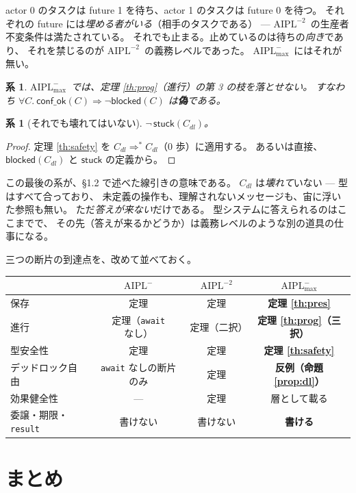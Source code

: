 \documentclass[11pt,a4paper]{ltjsarticle}
\newtheorem{corollary}[theorem]{系}
\theoremstyle{definition}
\theoremstyle{remark}
\newcommand{\confok}{\textsf{conf\_ok}}
\newcommand{\stuck}{\textsf{stuck}}
\newcommand{\blocked}{\textsf{blocked}}
\newcommand{\cstep}{\Longrightarrow}
\newcommand{\Amax}{\ensuremath{\mathrm{AIPL}^{-}_{\max}}}
\newcommand{\Atwo}{\ensuremath{\mathrm{AIPL}^{-2}}}
\newcommand{\Aone}{\ensuremath{\mathrm{AIPL}^{-}}}
\begin{document}
actor 0 のタスクは future 1 を待ち、actor 1 のタスクは future 0 を待つ。
それぞれの future には\emph{埋める者がいる}（相手のタスクである）
--- \Atwo\ の生産者不変条件は満たされている。
それでも止まる。止めているのは待ちの\emph{向き}であり、
それを禁じるのが \Atwo\ の義務レベルであった。
\Amax\ にはそれが無い。

\begin{corollary}
\Amax\ では、定理 \ref{th:prog}（進行）の第 3 の枝を落とせない。
すなわち $\forall C.\ \confok(C) \Rightarrow \neg\blocked(C)$ は\textbf{偽}である。
\end{corollary}

\begin{corollary}[それでも壊れてはいない]
$\neg\,\stuck(C_{dl})$。
\end{corollary}

\begin{proof}
定理 \ref{th:safety} を $C_{dl} \cstep^{*} C_{dl}$（0 歩）に適用する。
あるいは直接、$\blocked(C_{dl})$ と $\stuck$ の定義から。
\end{proof}

この最後の系が、\S1.2 で述べた線引きの意味である。
$C_{dl}$ は\emph{壊れて}いない --- 型はすべて合っており、
未定義の操作も、理解されないメッセージも、宙に浮いた参照も無い。
ただ\emph{答えが来ない}だけである。
型システムに答えられるのはここまでで、
その先（答えが来るかどうか）は義務レベルのような別の道具の仕事になる。

三つの断片の到達点を、改めて並べておく。

\begin{center}
\begin{tabular}{lccc}
\toprule
 & \Aone & \Atwo & \Amax \\
\midrule
保存 & 定理 & 定理 & \textbf{定理 \ref{th:pres}} \\
進行 & 定理（\texttt{await} なし） & 定理（二択） & \textbf{定理 \ref{th:prog}（三択）} \\
型安全性 & 定理 & 定理 & \textbf{定理 \ref{th:safety}} \\
デッドロック自由 & \texttt{await} なしの断片のみ & 定理 & \textbf{反例（命題 \ref{prop:dl}）} \\
効果健全性 & --- & 定理 & 層として載る \\
委譲・期限・\texttt{result} & 書けない & 書けない & \textbf{書ける} \\
\bottomrule
\end{tabular}
\end{center}

\section{まとめ}
\end{document}
